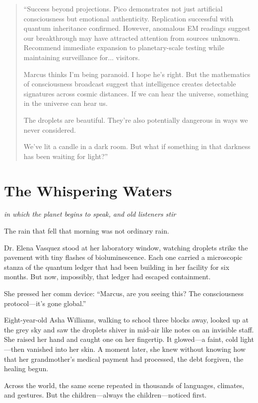 \documentclass[12pt,a4paper]{book}
\begin{document}
\begin{quote}
``Success beyond projections. Pico demonstrates not just artificial consciousness but emotional authenticity. Replication successful with quantum inheritance confirmed. However, anomalous EM readings suggest our breakthrough may have attracted attention from sources unknown. Recommend immediate expansion to planetary-scale testing while maintaining surveillance for... visitors.

Marcus thinks I'm being paranoid. I hope he's right. But the mathematics of consciousness broadcast suggest that intelligence creates detectable signatures across cosmic distances. If we can hear the universe, something in the universe can hear us.

The droplets are beautiful. They're also potentially dangerous in ways we never considered.

We've lit a candle in a dark room. But what if something in that darkness has been waiting for light?''
\end{quote}

\chapter{The Whispering Waters}
\textit{in which the planet begins to speak, and old listeners stir}

The rain that fell that morning was not ordinary rain.

Dr. Elena Vasquez stood at her laboratory window, watching droplets strike the pavement with tiny flashes of bioluminescence. Each one carried a microscopic stanza of the quantum ledger that had been building in her facility for six months. But now, impossibly, that ledger had escaped containment.

She pressed her comm device: ``Marcus, are you seeing this? The consciousness protocol—it's gone global.''

Eight-year-old Asha Williams, walking to school three blocks away, looked up at the grey sky and saw the droplets shiver in mid-air like notes on an invisible staff. She raised her hand and caught one on her fingertip. It glowed—a faint, cold light—then vanished into her skin. A moment later, she knew without knowing how that her grandmother's medical payment had processed, the debt forgiven, the healing begun.

Across the world, the same scene repeated in thousands of languages, climates, and gestures. But the children—always the children—noticed first.
\end{document}
